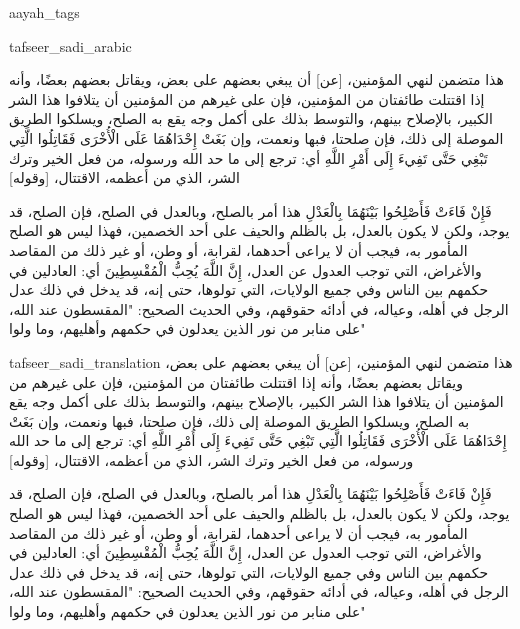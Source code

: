 \begin{taggedblock}{aayah_tags}
\end{taggedblock}
\begin{taggedblock}{tafseer_sadi_arabic}
\begin{Arabic}
هذا متضمن لنهي المؤمنين،
[عن]
أن يبغي بعضهم على بعض، ويقاتل  بعضهم بعضًا، وأنه إذا اقتتلت طائفتان من المؤمنين، فإن على غيرهم من المؤمنين أن يتلافوا هذا الشر الكبير، بالإصلاح بينهم، والتوسط بذلك على أكمل وجه يقع به الصلح، ويسلكوا الطريق الموصلة إلى ذلك، فإن صلحتا، فبها ونعمت، وإن
{ بَغَتْ إِحْدَاهُمَا عَلَى الْأُخْرَى فَقَاتِلُوا الَّتِي تَبْغِي حَتَّى تَفِيءَ إِلَى أَمْرِ اللَّهِ }
أي: ترجع إلى ما حد الله ورسوله، من فعل الخير وترك الشر، الذي من أعظمه، الاقتتال،
[وقوله]

{ فَإِنْ فَاءَتْ فَأَصْلِحُوا بَيْنَهُمَا بِالْعَدْلِ }
هذا أمر بالصلح، وبالعدل في الصلح، فإن الصلح، قد يوجد، ولكن لا يكون بالعدل، بل بالظلم والحيف على أحد الخصمين، فهذا ليس هو الصلح المأمور به، فيجب أن لا يراعى أحدهما، لقرابة، أو وطن، أو غير ذلك من المقاصد والأغراض، التي توجب العدول عن العدل،
{ إِنَّ اللَّهَ يُحِبُّ الْمُقْسِطِينَ }
أي: العادلين في حكمهم بين الناس وفي جميع الولايات، التي تولوها، حتى إنه، قد يدخل في ذلك عدل الرجل في أهله، وعياله، في أدائه حقوقهم، وفي الحديث الصحيح:
"المقسطون عند الله، على منابر من نور الذين يعدلون في حكمهم وأهليهم، وما ولوا"
\end{Arabic}
\end{taggedblock}
\begin{taggedblock}{tafseer_sadi_translation}
هذا متضمن لنهي المؤمنين،
[عن]
أن يبغي بعضهم على بعض، ويقاتل  بعضهم بعضًا، وأنه إذا اقتتلت طائفتان من المؤمنين، فإن على غيرهم من المؤمنين أن يتلافوا هذا الشر الكبير، بالإصلاح بينهم، والتوسط بذلك على أكمل وجه يقع به الصلح، ويسلكوا الطريق الموصلة إلى ذلك، فإن صلحتا، فبها ونعمت، وإن
{ بَغَتْ إِحْدَاهُمَا عَلَى الْأُخْرَى فَقَاتِلُوا الَّتِي تَبْغِي حَتَّى تَفِيءَ إِلَى أَمْرِ اللَّهِ }
أي: ترجع إلى ما حد الله ورسوله، من فعل الخير وترك الشر، الذي من أعظمه، الاقتتال،
[وقوله]

{ فَإِنْ فَاءَتْ فَأَصْلِحُوا بَيْنَهُمَا بِالْعَدْلِ }
هذا أمر بالصلح، وبالعدل في الصلح، فإن الصلح، قد يوجد، ولكن لا يكون بالعدل، بل بالظلم والحيف على أحد الخصمين، فهذا ليس هو الصلح المأمور به، فيجب أن لا يراعى أحدهما، لقرابة، أو وطن، أو غير ذلك من المقاصد والأغراض، التي توجب العدول عن العدل،
{ إِنَّ اللَّهَ يُحِبُّ الْمُقْسِطِينَ }
أي: العادلين في حكمهم بين الناس وفي جميع الولايات، التي تولوها، حتى إنه، قد يدخل في ذلك عدل الرجل في أهله، وعياله، في أدائه حقوقهم، وفي الحديث الصحيح:
"المقسطون عند الله، على منابر من نور الذين يعدلون في حكمهم وأهليهم، وما ولوا"
\end{taggedblock}

\begin{comment}
Please use the following for footnotes:- Sample\footnoteQ{Text of Qur'an footnote goes here.}.
Sample\footnoteT{Text of Tafseer footnote goes here.}.
\end{comment}